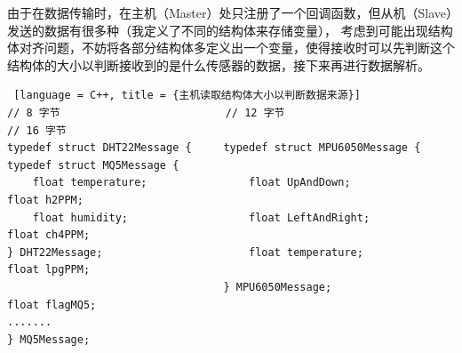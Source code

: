 由于在数据传输时，在主机（Master）处只注册了一个回调函数，但从机（Slave）发送的数据有很多种（我定义了不同的结构体来存储变量），
考虑到可能出现结构体对齐问题，不妨将各部分结构体多定义出一个变量，使得接收时可以先判断这个结构体的大小以判断接收到的是什么传感器的数据，接下来再进行数据解析。

\begin{lstlisting} [language = C++, title = {主机读取结构体大小以判断数据来源}]
// 8 字节                          // 12 字节                           // 16 字节
typedef struct DHT22Message {     typedef struct MPU6050Message {       typedef struct MQ5Message {
    float temperature;                float UpAndDown;                      float h2PPM;
    float humidity;                   float LeftAndRight;                   float ch4PPM;
} DHT22Message;                       float temperature;                    float lpgPPM;
                                  } MPU6050Message;                         float flagMQ5;
.......                                                                 } MQ5Message;
\end{lstlisting}

